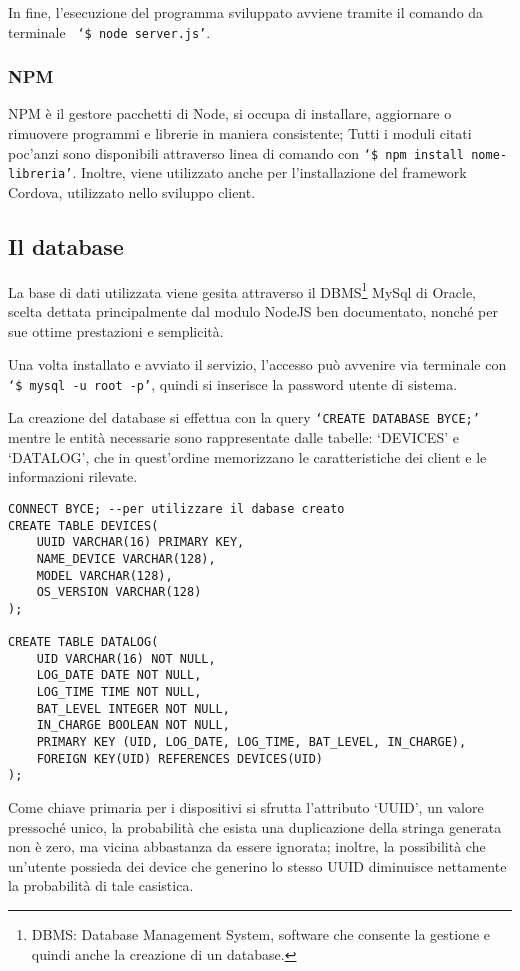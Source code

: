 \documentclass[target=bach]{thud}
\begin{document}
                In fine, l'esecuzione del programma sviluppato avviene tramite il comando da terminale \texttt{ `\$ node server.js'}.

                \subsubsection{NPM}
                NPM è il gestore pacchetti di Node, si occupa di installare, aggiornare o rimuovere programmi e librerie in maniera consistente; Tutti i moduli citati poc'anzi sono disponibili attraverso linea di comando con \texttt{`\$ npm install {{nome-libreria}}'}.
                Inoltre, viene utilizzato anche per l'installazione del framework Cordova, utilizzato nello sviluppo client.


            \subsection{Il database}
                La base di dati utilizzata viene gesita attraverso il DBMS\footnote[15]{DBMS: Database Management System, software che consente la gestione e quindi anche la creazione di un database.} MySql di Oracle, scelta dettata principalmente dal modulo NodeJS ben documentato, nonché per sue ottime prestazioni e semplicità.

                Una volta installato e avviato il servizio, l'accesso può avvenire via terminale con \texttt{`\$ mysql -u root -p'}, quindi si inserisce la password utente di sistema.

                La creazione del database si effettua con la query \texttt{`CREATE DATABASE BYCE;'} mentre le entità necessarie sono rappresentate dalle tabelle: `DEVICES' e `DATALOG', che in quest'ordine memorizzano le caratteristiche dei client e le informazioni rilevate.

\begin{lstlisting}
CONNECT BYCE; --per utilizzare il dabase creato
CREATE TABLE DEVICES(
    UUID VARCHAR(16) PRIMARY KEY,
    NAME_DEVICE VARCHAR(128),
    MODEL VARCHAR(128),
    OS_VERSION VARCHAR(128)
);

CREATE TABLE DATALOG(
    UID VARCHAR(16) NOT NULL,
    LOG_DATE DATE NOT NULL,
    LOG_TIME TIME NOT NULL,
    BAT_LEVEL INTEGER NOT NULL,
    IN_CHARGE BOOLEAN NOT NULL,
    PRIMARY KEY (UID, LOG_DATE, LOG_TIME, BAT_LEVEL, IN_CHARGE),
    FOREIGN KEY(UID) REFERENCES DEVICES(UID)
);
\end{lstlisting}

                Come chiave primaria per i dispositivi si sfrutta l'attributo `UUID', un valore pressoché unico, la probabilità che esista una duplicazione della stringa generata non è zero, ma vicina abbastanza da essere ignorata; inoltre, la possibilità che un'utente possieda dei device che generino lo stesso UUID diminuisce nettamente la probabilità di tale casistica.
\end{document}
